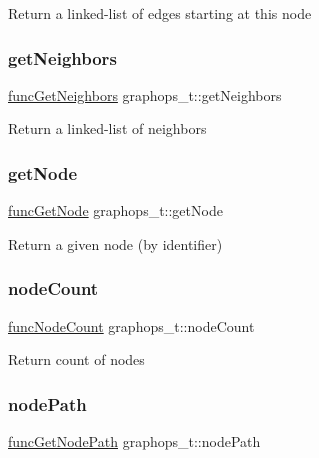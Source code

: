 Return a linked-\/list of edges starting at this node \mbox{\label{structgraphops__t_ac6c5bec2f102e4da5959cc3db66ac3c6}} 
\subsubsection{\texorpdfstring{get\+Neighbors}{getNeighbors}}
{\footnotesize\ttfamily \hyperlink{graphops_8h_a201169542b84db39bcb68ae94223e773}{func\+Get\+Neighbors} graphops\+\_\+t\+::get\+Neighbors}

Return a linked-\/list of neighbors \mbox{\label{structgraphops__t_ab410442ef123fc79f1c8a431502e2a23}} 
\subsubsection{\texorpdfstring{get\+Node}{getNode}}
{\footnotesize\ttfamily \hyperlink{graphops_8h_ab5b794bee2b91f62033011c8e4c867ec}{func\+Get\+Node} graphops\+\_\+t\+::get\+Node}

Return a given node (by identifier) \mbox{\label{structgraphops__t_a07801b43de87d48f426d7abf7959e738}} 
\subsubsection{\texorpdfstring{node\+Count}{nodeCount}}
{\footnotesize\ttfamily \hyperlink{graphops_8h_a5f1ba03cba8efec39224db7b6afc8374}{func\+Node\+Count} graphops\+\_\+t\+::node\+Count}

Return count of nodes \mbox{\label{structgraphops__t_afd2a0b194e922fa656b4352a8fed9e05}} 
\subsubsection{\texorpdfstring{node\+Path}{nodePath}}
{\footnotesize\ttfamily \hyperlink{graphops_8h_a43aa084c4514d1f3c2179551905aa655}{func\+Get\+Node\+Path} graphops\+\_\+t\+::node\+Path}

